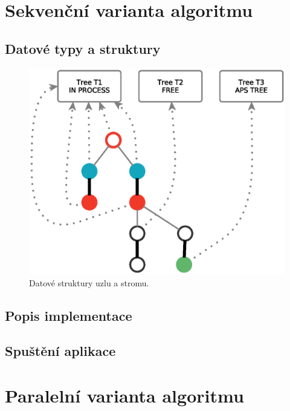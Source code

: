 \documentclass[a4paper, 11pt, titlepage, final]{article}[3. prosinec 2011]
\begin{document}
\section{Sekvenční varianta algoritmu}

\subsection{Datové typy a struktury}

\begin{figure}[ht]
  \centering
  \includegraphics[scale=0.5]{img/implementation.eps}
  \caption{Datové struktury uzlu a stromu.}
  \label{imgStructure}
\end{figure}

\subsection{Popis implementace}


\subsection{Spuštění aplikace}

\section{Paralelní varianta algoritmu}
\end{document}
